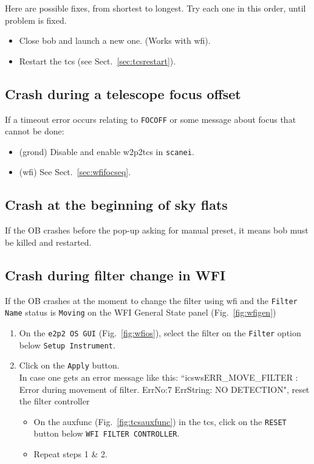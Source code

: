 \documentclass[11pt,fleqn]{book} %
\begin{document}
Here are possible fixes, from shortest to longest.  Try each one in this
order, until problem is fixed.
\begin{itemize}
  \item Close \gls{bob} and launch a new one. (Works with \gls{wfi}).
  \item Restart the \gls{tcs} (see Sect.~\ref{sec:tcsrestart}).
\end{itemize}

\subsection{Crash during a telescope focus offset}
If a timeout error occurs relating to \texttt{FOCOFF} or some message about
focus that cannot be done:
\begin{itemize}
  \item (\gls{grond}) Disable and enable w2p2tcs in \texttt{scanei}.
  \item (\gls{wfi}) See Sect.~\ref{sec:wfifocseq}.
\end{itemize}

\subsection{Crash at the beginning of sky flats}
If the OB crashes before the pop-up asking for manual preset, it means
bob must be killed and restarted.

\subsection{Crash during filter change in WFI}
If the OB crashes at the moment to change the filter using \gls{wfi} and the \texttt{Filter Name} status is \texttt{Moving} on the WFI General State panel (Fig.~\ref{fig:wfigen})
 \begin{enumerate}
      \item On the \texttt{e2p2 OS GUI} (Fig.~\ref{fig:wfios}), select the filter on the \texttt{Filter} option below \texttt{Setup Instrument}.
      \item Click on the \texttt{Apply} button.\\
           In case one gets an error message like this: ``icswsERR\_MOVE\_FILTER : Error during movement of filter. ErrNo:7 ErrString: NO DETECTION", reset the filter controller
           \begin{itemize}
           \item On the \gls{auxfunc} (Fig.~\ref{fig:tcsauxfunc}) in the \gls{tcs}, click on the \texttt{RESET} button below \texttt {WFI FILTER CONTROLLER}.
           \item Repeat steps 1 \& 2.
           \end{itemize}
 \end{enumerate}
\end{document}
